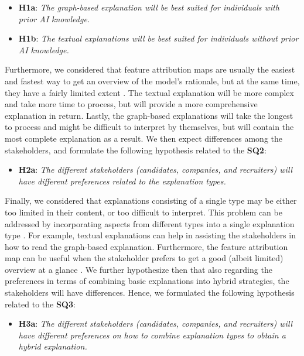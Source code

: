\begin{itemize}
    \item \textbf{H1a}: \textit{The graph-based explanation will be best suited for individuals with prior AI knowledge.}
    \item \textbf{H1b}: \textit{The textual explanations will be best suited for individuals without prior AI knowledge.}    
\end{itemize}

Furthermore, we considered that feature attribution maps are usually the easiest and fastest way to get an overview of the model's rationale, but at the same time, they have a fairly limited extent \cite{szymanski2021visual}. The textual explanation will be more complex and take more time to process, but will provide a more comprehensive explanation in return. Lastly, the graph-based explanations will take the longest to process and might be difficult to interpret by themselves, but will contain the most complete explanation as a result. We then expect differences among the stakeholders, and formulate the following hypothesis related to the \textbf{SQ2}:

\begin{itemize}
    \item \textbf{H2a}: \textit{The different stakeholders (candidates, companies, and recruiters) will have different preferences related to the explanation types.}   
\end{itemize}

Finally, we considered that explanations consisting of a single type may be either too limited in their content, or too difficult to interpret. This problem can be addressed by incorporating aspects from different types into a single explanation type \cite{szymanski2021visual}. For example, textual explanations can help in assisting the stakeholders in how to read the graph-based explanation. Furthermore, the feature attribution map can be useful when the stakeholder prefers to get a good (albeit limited) overview at a glance \cite{schellingerhout2022explainable}. We further hypothesize then that also regarding the preferences in terms of combining basic explanations into hybrid strategies, the stakeholders will have differences. Hence, we formulated the following hypothesis related to the \textbf{SQ3}:

\begin{itemize}
    \item \textbf{H3a}: \textit{The different stakeholders (candidates, companies, and recruiters) will have different preferences on how to combine explanation types to obtain a hybrid explanation.}

\end{itemize}


